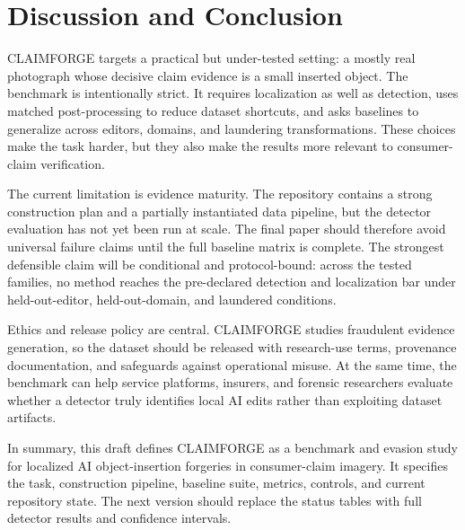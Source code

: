 \section{Discussion and Conclusion}

CLAIMFORGE targets a practical but under-tested setting: a mostly real photograph whose decisive claim evidence is a small inserted object. The benchmark is intentionally strict. It requires localization as well as detection, uses matched post-processing to reduce dataset shortcuts, and asks baselines to generalize across editors, domains, and laundering transformations. These choices make the task harder, but they also make the results more relevant to consumer-claim verification.

The current limitation is evidence maturity. The repository contains a strong construction plan and a partially instantiated data pipeline, but the detector evaluation has not yet been run at scale. The final paper should therefore avoid universal failure claims until the full baseline matrix is complete. The strongest defensible claim will be conditional and protocol-bound: across the tested families, no method reaches the pre-declared detection and localization bar under held-out-editor, held-out-domain, and laundered conditions.

Ethics and release policy are central. CLAIMFORGE studies fraudulent evidence generation, so the dataset should be released with research-use terms, provenance documentation, and safeguards against operational misuse. At the same time, the benchmark can help service platforms, insurers, and forensic researchers evaluate whether a detector truly identifies local AI edits rather than exploiting dataset artifacts.

In summary, this draft defines CLAIMFORGE as a benchmark and evasion study for localized AI object-insertion forgeries in consumer-claim imagery. It specifies the task, construction pipeline, baseline suite, metrics, controls, and current repository state. The next version should replace the status tables with full detector results and confidence intervals.
